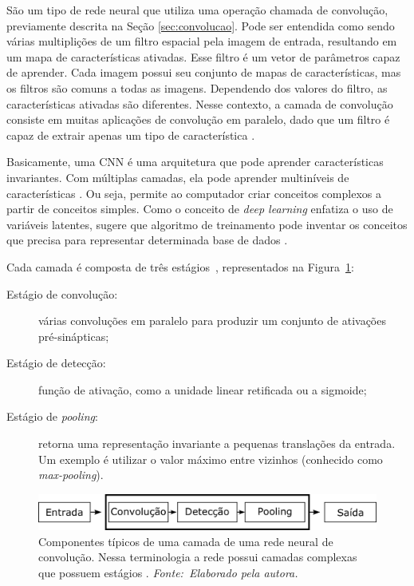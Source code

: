 São um tipo de rede neural que utiliza uma operação chamada de convolução, previamente descrita na Seção \ref{sec:convolucao}. Pode ser entendida como sendo várias multiplições de um filtro espacial pela imagem de entrada, resultando em um mapa de características ativadas. Esse filtro é um vetor de parâmetros capaz de aprender. Cada imagem possui seu conjunto de mapas de características, mas os filtros são comuns a todas as imagens. Dependendo dos valores do filtro, as características ativadas são diferentes. Nesse contexto, a camada de convolução consiste em muitas aplicações de convolução em paralelo, dado que um filtro é capaz de extrair apenas um tipo de característica \cite{Bengio-et-al-2014-Book}.

Basicamente, uma CNN é uma arquitetura que pode aprender características invariantes. Com múltiplas camadas, ela pode aprender multiníveis de características \cite{lecun2010}. Ou seja, permite ao computador criar conceitos complexos a partir de conceitos simples. Como o conceito de \textit{deep learning} enfatiza o uso de variáveis latentes, sugere que algoritmo de treinamento pode inventar os conceitos que precisa para representar determinada base de dados \cite{Bengio-et-al-2014-Book}.

Cada camada é composta de três estágios~, representados na Figura~\ref{fig:cnn}:

\begin{description}
\item [Estágio de convolução:] várias convoluções em paralelo para produzir um conjunto de ativações pré-sinápticas;
\item [Estágio de detecção:] função de ativação, como a unidade linear retificada ou a sigmoide;
\item [Estágio de \textit{pooling}:] retorna uma representação invariante a pequenas translações da entrada. Um exemplo é utilizar o valor máximo entre vizinhos (conhecido como \textit{max-pooling}). %
\end{description}
\begin{figure}[htbp]
 \begin{center}
   \includegraphics[width=1\linewidth]{figuras/convlayer.png}
 \end{center}
 \caption[Componentes típicos de uma camada de uma rede neural de convolução.]{Componentes típicos de uma camada de uma rede neural de convolução. Nessa terminologia a rede possui camadas complexas que possuem estágios \cite{Bengio-et-al-2014-Book}. \textit{Fonte:~Elaborado pela autora.}}
 \label{fig:cnn}
\end{figure}

